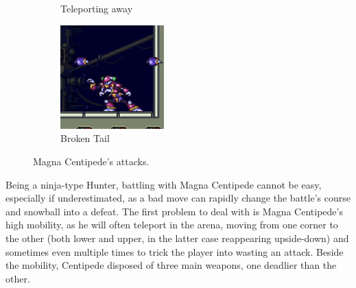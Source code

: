 \begin{figure}[htp]
\begin{subfigure}{0.4\linewidth}
		\caption{Teleporting away}
	\end{subfigure}
	\begin{subfigure}{0.4\linewidth}
		\centering
		\includegraphics[height=4cm]{figures/X2/Magna_centipede/Centipede_no_tail.png}
		\caption{Broken Tail}
	\end{subfigure}
	\caption{Magna Centipede's attacks.}	
\end{figure}
Being a ninja-type Hunter, battling with Magna Centipede cannot be easy, especially if underestimated, as a bad move can rapidly change the battle's course and snowball into a defeat. The first problem to deal with is Magna Centipede's high mobility, as he will often teleport in the arena, moving from one corner to the other (both lower and upper, in the latter case reappearing upside-down) and sometimes even multiple times to trick the player into wasting an attack. Beside the mobility, Centipede disposed of three main weapons, one deadlier than the other.

